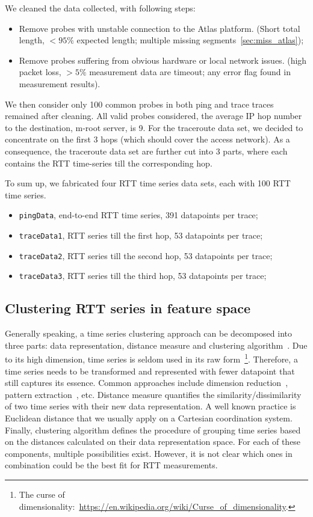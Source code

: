 We cleaned the data collected, with following steps:
\begin{itemize}
\item Remove probes with unstable connection to the Atlas platform. (Short total length,  $< 95\%$ expected length; multiple missing segments~\ref{sec:miss_atlas});
\item Remove probes suffering from obvious hardware or local network issues. (high packet loss, $> 5\%$ measurement data are timeout; any error flag found in measurement results).
\end{itemize}

We then consider only 100 common probes in both ping and trace traces remained after cleaning.
All valid probes considered, the average IP hop number to the destination, m-root server, is 9. 
For the traceroute data set, we decided to concentrate on the first 3 hops (which should cover the access network). As a consequence, the traceroute data set are further cut into 3 parts, where each contains the RTT time-series till the corresponding hop.

To sum up, we fabricated four RTT time series data sets, each with 100 RTT time series.
\begin{itemize}
\item \texttt{pingData}, end-to-end RTT time series, 391 datapoints per trace;
\item \texttt{traceData1}, RTT series till the first hop, 53 datapoints per trace;
\item \texttt{traceData2}, RTT series till the second hop, 53 datapoints per trace;
\item \texttt{traceData3}, RTT series till the third hop, 53 datapoints per trace;
\end{itemize}

\subsection{Clustering RTT series in feature space}
\label{sec:cls_ft}
Generally speaking, a time series clustering approach can be decomposed into three parts: data representation, distance measure and clustering algorithm~\cite{Aghabozorgi2015}. 
Due to its high dimension, time series is seldom used in its raw form~\footnote{The curse of dimensionality:~\url{https://en.wikipedia.org/wiki/Curse_of_dimensionality}.}.
Therefore, a time series needs to be transformed and represented with fewer datapoint that still captures its essence.
Common approaches include dimension reduction~\cite{Elhamifar2013}, pattern extraction~\cite{Ulanova2015}, etc.
Distance measure quantifies the similarity/dissimilarity of two time series with their new data representation.
A well known practice is Euclidean distance that we usually apply on a Cartesian coordination system.
Finally, clustering algorithm defines the procedure of grouping time series based on the distances calculated on their data representation space.
For each of these components, multiple possibilities exist. However, it is not clear which ones in combination could be the best fit for RTT measurements. 

